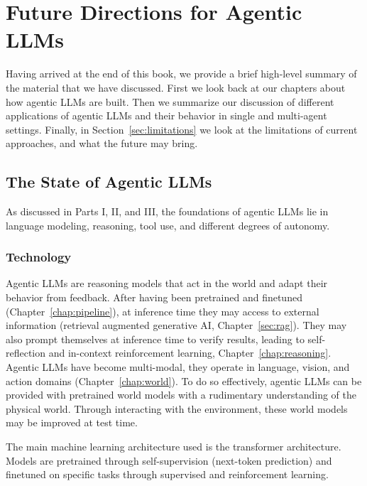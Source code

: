 \chapter{Future Directions for Agentic LLMs}\label{chap:concl}


Having arrived at the end of this book, we provide a brief high-level summary of the material that we have discussed. First we look back at our chapters about how agentic LLMs are built. Then we summarize our discussion of different applications of agentic LLMs and their behavior in single and multi-agent settings. Finally, in Section~\ref{sec:limitations} we look at the limitations of current approaches, and what the future may bring.

\section{The State of Agentic LLMs}
As discussed in Parts I, II, and III, the foundations of agentic LLMs lie in language modeling, reasoning, tool use, and different degrees of autonomy.

\subsection{Technology} 
Agentic LLMs are reasoning  models that act in the world and adapt their behavior from feedback. After having been pretrained and finetuned (Chapter~\ref{chap:pipeline}), at inference time they may access to external information (retrieval augmented generative AI, Chapter~\ref{sec:rag}). They may also prompt themselves at inference time to verify results, leading to self-reflection and in-context reinforcement learning, Chapter~\ref{chap:reasoning}. Agentic LLMs have become multi-modal, they operate in language, vision, and action domains (Chapter~\ref{chap:world}). To do so effectively, agentic LLMs can be provided with pretrained world models with a rudimentary understanding of the physical world. Through interacting with the environment, these world models may be improved at test time. 

The main machine learning architecture used is the transformer architecture. Models are pretrained through self-supervision (next-token prediction) and finetuned on specific tasks through supervised and reinforcement learning. 

